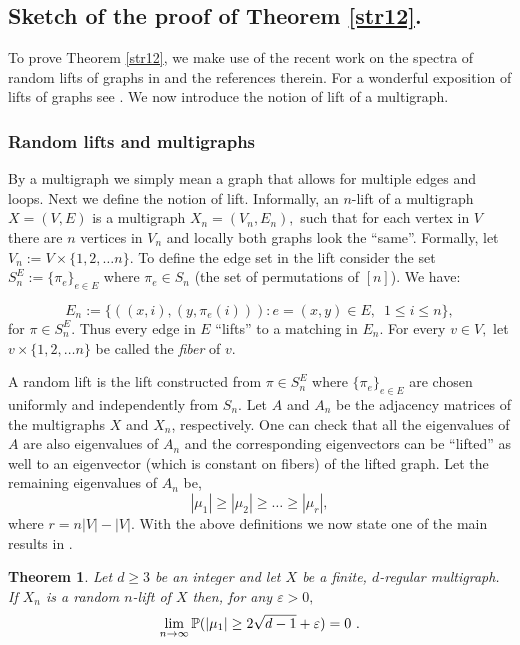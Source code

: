 \documentclass[11pt,reqno]{amsart}
\newcommand{\e}{\varepsilon}
\newtheorem{theorem}{Theorem}
\begin{document}
\subsection{Sketch of the proof of Theorem \ref{str12}.} \label{sop2}

To prove Theorem \ref{str12}, we make use of the recent work on the spectra of random lifts of graphs in \cite{FK14,B15} and the references therein. For a wonderful exposition of lifts of graphs see \cite{Linial}. We now introduce the notion of lift of a multigraph.

\subsubsection{Random lifts and multigraphs}\label{rlmg}

By a multigraph we simply mean a graph that allows for multiple edges and loops. Next we define the notion of lift. Informally, an $n$-lift of a
multigraph $X=(V,E)$ is a multigraph $X_n=(V_n,E_n),$ such
that for each vertex in $V$ there are $n$ vertices in $V_n$ and
locally both graphs look the ``same''. Formally, let $V_n:=V \times
\{1,2,\ldots n\}$. To define the edge set
in the lift consider the set $S^{E}_n:=\{\pi_{e}\}_{e\in E}$ where
$\pi_{e}\in S_n$ (the set of permutations of $[n]$). We have:

 $$E_n:=\{((x,i),(y,\pi_{e}(i))): e=(x,y)\in E,\,\,\, 1\le i\le n\},$$
for $\pi\in S_{n}^{E}.$
Thus every edge in $E$ ``lifts'' to a matching in $E_n.$  For every $v \in V,$ let $v\times \{1,2,\ldots n\}$ be called the \emph{fiber} of $v.$

A random lift is the lift constructed from $\pi \in S_n^{E}$ where
$\{\pi_{e}\}_{e\in E}$ are chosen uniformly and independently from $S_n.$
Let $A$ and $A_n$ be the adjacency matrices of the multigraphs $X$ and $X_n$, respectively. One can check that all the eigenvalues of $A$ are also eigenvalues of $A_n$ and the corresponding eigenvectors can be ``lifted'' as well to an eigenvector (which is constant on fibers) of the lifted graph.
Let the remaining eigenvalues of $A_n$ be,
\begin{equation}\label{remain1}
|\mu_1| \ge |\mu_2|\ge \ldots \ge |\mu_{r}|,
\end{equation}
where $r=n|V|-|V|.$
With the above definitions we now state one of the main results in \cite{FK14}.
\begin{theorem}\label{spectralnorm} Let $d\ge 3$ be an integer and let $X$ be a finite, $d$-regular multigraph. If $X_n$ is a random $n$-lift of $X$ then, for any $\e>0,$ $$\lim_{n\to \infty}\P(|\mu_1|\ge 2\sqrt{d-1}+\e)= 0~.$$
\end{theorem}
\end{document}
